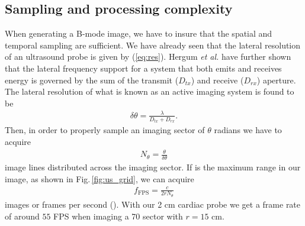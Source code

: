 \subsection{Sampling and processing complexity}
When generating a B-mode image, we have to insure that the spatial and temporal sampling are sufficient. We have already seen that the lateral resolution of an ultrasound probe is given by (\ref{eq:res}).  Hergum \textit{et al.} \cite{Hergum2009} have further shown that the lateral frequency support for a system that both emits and receives energy is governed by the sum of the transmit ($D_{tx}$) and receive ($D_{rx}$) aperture. The lateral resolution of what is known as an active imaging system is found to be
\begin{align}
\delta\theta = \frac{\lambda}{D_{tx} + D_{rx}}.
\end{align}
Then, in order to properly sample an imaging sector of $\theta$ radians we have to acquire 
\begin{align}
N_\theta = \frac{\theta}{\delta\theta}
\end{align}
image lines distributed across the imaging sector. If  is the maximum range in our image, as shown in Fig.\,\ref{fig:us_grid}, we can acquire
\begin{align}
f_{\text{FPS}} = \frac{c}{2rN_\theta}
\end{align} 
images or frames per second (). With our 2 cm cardiac probe we get a frame rate of around $55$ FPS when imaging a 70\degree{} sector with $r=15$ cm.

